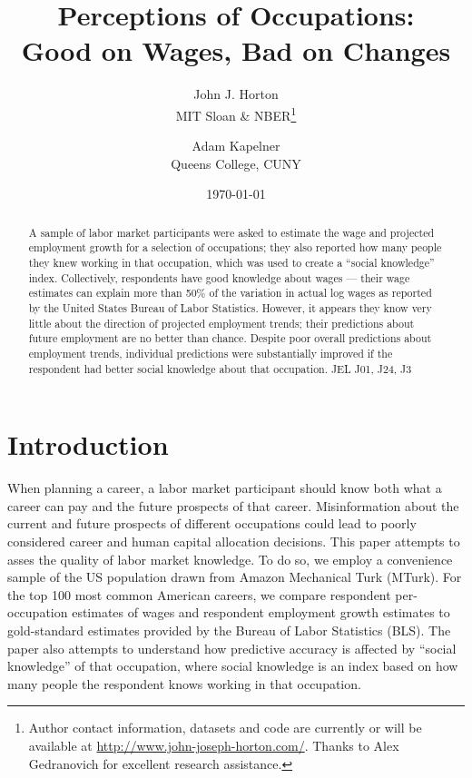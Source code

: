 \documentclass[12pt]{article}
\begin{document}
 

\title{Perceptions of Occupations: \\ Good on Wages, Bad on Changes}

\date{\today}

\author{John J. Horton \\ MIT Sloan \& NBER\footnote{Author contact information, datasets and
    code are currently or will be available at
    \href{http://www.john-joseph-horton.com/}{http://www.john-joseph-horton.com/}. 
    Thanks to Alex Gedranovich for excellent research assistance. 
} \and Adam Kapelner \\ Queens College, CUNY}
\maketitle

\begin{abstract}
\noindent  
A sample of labor market participants were asked to estimate the wage and projected employment growth for a selection of occupations;
they also reported how many people they knew working in that occupation, which was used to create a ``social knowledge'' index. 
Collectively, respondents have good knowledge about wages --- their wage estimates can explain more than 50\% of the variation in actual log wages as reported by the United States Bureau of Labor Statistics.
However, it appears they know very little about the direction of projected employment trends; their predictions about future employment are no better than chance. 
Despite poor overall predictions about employment trends, individual predictions were substantially improved if the respondent had better social knowledge about that occupation.
\newline 
\newline 
\noindent JEL J01, J24, J3
\end{abstract} 


\section{Introduction}
When planning a career, a labor market participant should know both what a career can pay and the future prospects of that career.
Misinformation about the current and future prospects of different occupations could lead to poorly considered career and human capital allocation decisions. 
This paper attempts to asses the quality of labor market knowledge. To do so, we employ
a convenience sample of the US population drawn from Amazon Mechanical Turk (MTurk). For the top 100 most common American careers, we compare respondent per-occupation estimates of wages and respondent employment growth estimates to gold-standard estimates provided by the Bureau of Labor Statistics (BLS). 
The paper also attempts to understand how predictive accuracy is affected by ``social knowledge'' of that occupation, where social knowledge is an index based on how many people the respondent knows working in that occupation.
\end{document}

